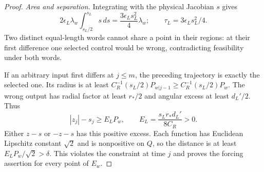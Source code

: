 \documentclass[11pt]{amsart}
\theoremstyle{definition}
\theoremstyle{remark}
\numberwithin{equation}{section}
\begin{document}
\begin{proof}
\smallskip
\emph{Area and separation.}
Integrating with the physical Jacobian $s$ gives
\[
2\epsilon_L\lambda_w\int_{s_L/2}^{s_L}s\,ds
 =\frac{3\epsilon_Ls_L^2}{4}\lambda_w;
\qquad \tau_L=3\epsilon_Ls_L^2/4.
\]
Two distinct equal-length words cannot share a point in their
regions: at their first difference one selected control would
be wrong, contradicting feasibility under both words.

If an arbitrary input first differs at $j\le m$, the preceding
trajectory is exactly the selected one. Its radius is at least
$C_R^{-1}(s_L/2)P_{w|j-1}\ge C_R^{-1}(s_L/2)P_w$.
The wrong output has radial factor at least $r_*/2$ and angular
excess at least $d_L'/2$. Thus
\begin{equation}\label{eq:massmargin}
|z_j|-s_j\ge E_LP_w,\qquad
                         E_L=\frac{s_Lr_*d_L'}{8C_R}>0.
\end{equation}
Either $z-s$ or $-z-s$ has this positive excess. Each function
has Euclidean Lipschitz constant $\sqrt2$ and is nonpositive on
$Q$, so the distance is at least $E_LP_w/\sqrt2>\delta$.
This violates the constraint at time $j$ and proves the forcing
assertion for every point of $E_w$.
\end{proof}
\end{document}
